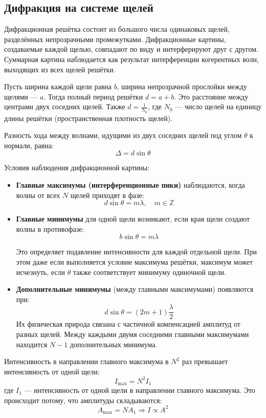 \documentclass[12pt]{article}
\begin{document}
\subsection{Дифракция на системе щелей}

Дифракционная решётка состоит из большого числа одинаковых щелей, разделённых непрозрачными промежутками. Дифракционные картины, создаваемые каждой щелью, совпадают по виду и интерферируют друг с другом. Суммарная картина наблюдается как результат интерференции когерентных волн, выходящих из всех щелей решётки.

Пусть ширина каждой щели равна $b$, ширина непрозрачной прослойки между щелями — $a$. Тогда полный период решётки $d = a + b$. Это расстояние между центрами двух соседних щелей. Также $d = \frac{1}{N_0}$, где $N_0$ — число щелей на единицу длины решётки (пространственная плотность щелей).

Разность хода между волнами, идущими из двух соседних щелей под углом $\theta$ к нормали, равна:
\[
\Delta = d \sin \theta
\]

Условия наблюдения дифракционной картины:
\begin{itemize}
    \item \textbf{Главные максимумы (интерференционные пики)} наблюдаются, когда волны от всех $N$ щелей приходят в фазе:
    \[
    d \sin \theta = m \lambda, \quad m \in \mathbb{Z}
    \]
    
    \item \textbf{Главные минимумы} для одной щели возникают, если края щели создают волны в противофазе:
    \[
    b \sin \theta = m \lambda
    \]
    
    Это определяет подавление интенсивности для каждой отдельной щели. При этом даже если выполняется условие максимума решётки, максимум может исчезнуть, если $\theta$ также соответствует минимуму одиночной щели.

    \item \textbf{Дополнительные минимумы} (между главными максимумами) появляются при:
    \[
    d \sin \theta = \left(2m + 1\right) \frac{\lambda}{2}
    \]
    Их физическая природа связана с частичной компенсацией амплитуд от разных щелей. Между каждыми двумя соседними главными максимумами находится $N - 1$ дополнительных минимума.
\end{itemize}

Интенсивность в направлении главного максимума в $N^2$ раз превышает интенсивность от одной щели:
\[
I_{\max} = N^2 I_1
\]
где $I_1$ — интенсивность от одной щели в направлении главного максимума. Это происходит потому, что амплитуды складываются:
\[
A_{\max} = N A_1
\Rightarrow I \propto A^2
\]
\end{document}
